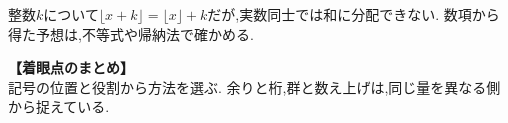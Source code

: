     整数$k$について$\lfloor x+k\rfloor=\lfloor x\rfloor+k$だが,実数同士では和に分配できない.
    数項から得た予想は,不等式や帰納法で確かめる.

  
  
  
  
  
  
  
  
  
  

  \medskip
  \noindent \textbf{【着眼点のまとめ】}\\
    記号の位置と役割から方法を選ぶ.
    余りと桁,群と数え上げは,同じ量を異なる側から捉えている.

